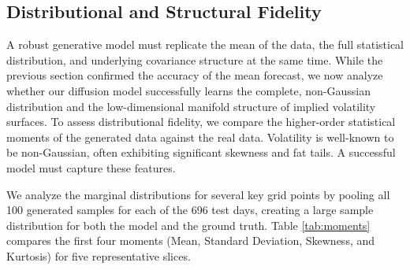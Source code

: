 \documentclass{article}
\begin{document}
\subsection{Distributional and Structural Fidelity}
A robust generative model must replicate the mean of the data, the full statistical distribution, and underlying covariance structure at the same time. While the previous section confirmed the accuracy of the mean forecast, we now analyze whether our diffusion model successfully learns the complete, non-Gaussian distribution and the low-dimensional manifold structure of implied volatility surfaces. To assess distributional fidelity, we compare the higher-order statistical moments of the generated data against the real data. Volatility is well-known to be non-Gaussian, often exhibiting significant skewness and fat tails. A successful model must capture these features.

We analyze the marginal distributions for several key grid points by pooling all 100 generated samples for each of the 696 test days, creating a large sample distribution for both the model and the ground truth. Table \ref{tab:moments} compares the first four moments (Mean, Standard Deviation, Skewness, and Kurtosis) for five representative slices.
\begin{table}[h!]
    \centering
    \caption{Comparison of Statistical Moments for Key IV Slices (Test Set).}
    \label{tab:moments}

    \caption*{Comparison of the first four statistical moments between the real data distribution and the pooled distribution of all generated samples from the diffusion model over the entire test set. Kurtosis is reported as Fisher's kurtosis (normal=0).}
\end{table}
\end{document}
